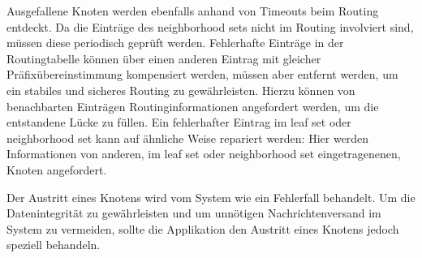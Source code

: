 Ausgefallene Knoten werden ebenfalls anhand von Timeouts beim Routing entdeckt. Da die Einträge des neighborhood sets nicht im Routing involviert sind, müssen diese periodisch geprüft werden. Fehlerhafte Einträge in der Routingtabelle können über einen anderen Eintrag mit gleicher Präfixübereinstimmung kompensiert werden, müssen aber entfernt werden, um ein stabiles und sicheres Routing zu gewährleisten. Hierzu können von benachbarten Einträgen Routinginformationen angefordert werden, um die entstandene Lücke zu füllen. Ein fehlerhafter Eintrag im leaf set oder neighborhood set kann auf ähnliche Weise repariert werden: Hier werden Informationen von anderen, im leaf set oder neighborhood set eingetragenenen, Knoten angefordert.

Der Austritt eines Knotens wird vom System wie ein Fehlerfall behandelt. Um die Datenintegrität zu gewährleisten und um unnötigen Nachrichtenversand im System zu vermeiden, sollte die Applikation den Austritt eines Knotens jedoch speziell behandeln.

